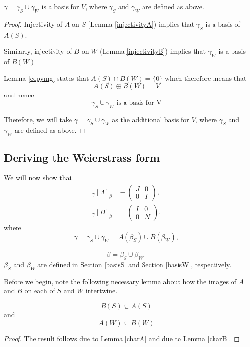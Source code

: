 \begin{lemma}
    $\gamma=\gamma_S\cup \gamma_W$ is a basis for $V$, where  $\gamma_S$ and $\gamma_W$ are defined as above.
\end{lemma}
\begin{proof}
    Injectivity of $A$ on $S$ (Lemma \ref{injectivityA}) implies that $\gamma_S$ is a basis of $A(S)$.

    Similarly, injectivity of $B$ on $W$ (Lemma \ref{injectivityB}) implies that $\gamma_W$ is a basis of $B(W)$.

    Lemma \ref{copying} states that $A(S)\cap B(W)=\{0\}$ which therefore means that $$A(S)\oplus B(W)=V$$and hence $$\gamma_S\cup \gamma_W\text{ is a basis for V}$$

Therefore, we will take $\gamma=\gamma_S\cup \gamma_W$ as the additional basis for $V$, where $\gamma_S$ and $\gamma_W$ are defined as above.



\end{proof}
\subsection{Deriving the Weierstrass form}
We will now show that
\begin{equation}\label{weierstrass}
\begin{aligned}
{}_{\gamma}[A]_{\beta}
&=
\begin{pmatrix}
J & 0\\
0 & I
\end{pmatrix},
\\[1em]
{}_{\gamma}[B]_{\beta}
&=
\begin{pmatrix}
I & 0\\
0 & N
\end{pmatrix}.
\end{aligned}
\end{equation}
where $$\gamma = \gamma_S\cup \gamma_W=A(\beta_S)\cup B(\beta_W),$$ \\
$$\beta=\beta_S\cup \beta_W,$$
$\beta_S$ and $\beta_W$ are defined in Section \ref{basisS} and Section \ref{basisW}, respectively.

Before we begin, note the following necessary lemma about how the images of $A$ and $B$ on each of $S$ and $W$ intertwine.
\begin{lemma}
    \begin{equation}\label{incl1}
    B(S)\subseteq A(S)
\end{equation}
and
\begin{equation}\label{incl2}
    A(W)\subseteq B(W)
\end{equation}
\end{lemma}
\begin{proof}
   The result follows due to Lemma \ref{charA} and due to Lemma \ref{charB}.
\end{proof}


